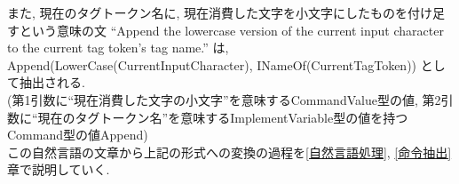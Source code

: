 \documentclass[uplatex,a4j]{jsreport}
\begin{document}
また, 現在のタグトークン名に, 現在消費した文字を小文字にしたものを付け足すという意味の文 
``Append the lowercase version of the current input character to the current tag token's tag name.'' は, \\
Append(LowerCase(CurrentInputCharacter), INameOf(CurrentTagToken)) として抽出される. \\
(第1引数に``現在消費した文字の小文字''を意味するCommandValue型の値, 第2引数に``現在のタグトークン名''を意味するImplementVariable型の値を持つCommand型の値Append)\\

この自然言語の文章から上記の形式への変換の過程を\ref{自然言語処理}, \ref{命令抽出}章で説明していく.\\
\end{document}

